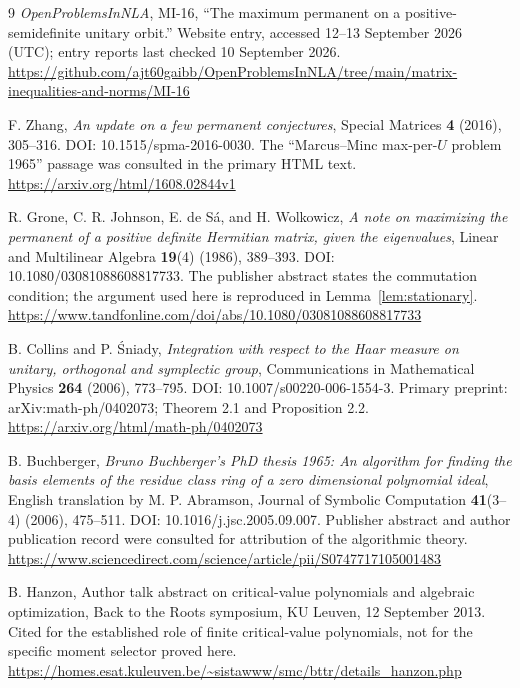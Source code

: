 \documentclass[11pt]{article}
\theoremstyle{definition}\newtheorem{definition}[theorem]{Definition}
\theoremstyle{remark}\newtheorem{remark}[theorem]{Remark}
\begin{document}
\begin{thebibliography}{9}
\emph{OpenProblemsInNLA}, MI-16, ``The maximum permanent on a positive-semidefinite unitary orbit.'' Website entry, accessed 12--13 September 2026 (UTC); entry reports last checked 10 September 2026.\\
\url{https://github.com/ajt60gaibb/OpenProblemsInNLA/tree/main/matrix-inequalities-and-norms/MI-16}

F. Zhang, \emph{An update on a few permanent conjectures}, Special Matrices \textbf{4} (2016), 305--316. DOI: 10.1515/spma-2016-0030. The ``Marcus--Minc max-per-$U$ problem 1965'' passage was consulted in the primary HTML text.\\
\url{https://arxiv.org/html/1608.02844v1}

R. Grone, C. R. Johnson, E. de S\'a, and H. Wolkowicz,
\emph{A note on maximizing the permanent of a positive definite Hermitian matrix, given the eigenvalues}, Linear and Multilinear Algebra \textbf{19}(4) (1986), 389--393. DOI: 10.1080/03081088608817733. The publisher abstract states the commutation condition; the argument used here is reproduced in Lemma~\ref{lem:stationary}.\\
\url{https://www.tandfonline.com/doi/abs/10.1080/03081088608817733}

B. Collins and P. \'{S}niady, \emph{Integration with respect to the Haar measure on unitary, orthogonal and symplectic group}, Communications in Mathematical Physics \textbf{264} (2006), 773--795. DOI: 10.1007/s00220-006-1554-3. Primary preprint: arXiv:math-ph/0402073; Theorem 2.1 and Proposition 2.2.\\
\url{https://arxiv.org/html/math-ph/0402073}

B. Buchberger, \emph{Bruno Buchberger's PhD thesis 1965: An algorithm for finding the basis elements of the residue class ring of a zero dimensional polynomial ideal}, English translation by M. P. Abramson, Journal of Symbolic Computation \textbf{41}(3--4) (2006), 475--511. DOI: 10.1016/j.jsc.2005.09.007. Publisher abstract and author publication record were consulted for attribution of the algorithmic theory.\\
\url{https://www.sciencedirect.com/science/article/pii/S0747717105001483}

B. Hanzon, Author talk abstract on critical-value polynomials and algebraic optimization, Back to the Roots symposium, KU Leuven, 12 September 2013. Cited for the established role of finite critical-value polynomials, not for the specific moment selector proved here.\\
\url{https://homes.esat.kuleuven.be/~sistawww/smc/bttr/details_hanzon.php}
\end{thebibliography}
\end{document}

